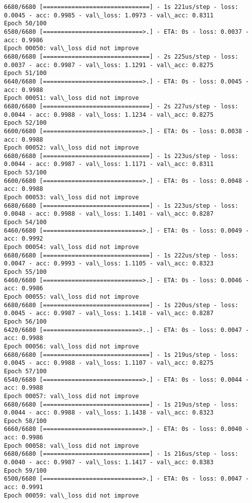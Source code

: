 \documentclass[11pt]{article}
\begin{document}
\begin{Verbatim}[commandchars=\\\{\}]
6680/6680 [==============================] - 1s 221us/step - loss: 0.0045 - acc: 0.9985 - val\_loss: 1.0973 - val\_acc: 0.8311
Epoch 50/100
6580/6680 [============================>.] - ETA: 0s - loss: 0.0037 - acc: 0.9986
Epoch 00050: val\_loss did not improve
6680/6680 [==============================] - 2s 225us/step - loss: 0.0037 - acc: 0.9987 - val\_loss: 1.1291 - val\_acc: 0.8275
Epoch 51/100
6640/6680 [============================>.] - ETA: 0s - loss: 0.0045 - acc: 0.9988
Epoch 00051: val\_loss did not improve
6680/6680 [==============================] - 2s 227us/step - loss: 0.0044 - acc: 0.9988 - val\_loss: 1.1234 - val\_acc: 0.8275
Epoch 52/100
6600/6680 [============================>.] - ETA: 0s - loss: 0.0038 - acc: 0.9988
Epoch 00052: val\_loss did not improve
6680/6680 [==============================] - 1s 223us/step - loss: 0.0044 - acc: 0.9987 - val\_loss: 1.1171 - val\_acc: 0.8311
Epoch 53/100
6600/6680 [============================>.] - ETA: 0s - loss: 0.0048 - acc: 0.9988
Epoch 00053: val\_loss did not improve
6680/6680 [==============================] - 1s 223us/step - loss: 0.0048 - acc: 0.9988 - val\_loss: 1.1401 - val\_acc: 0.8287
Epoch 54/100
6460/6680 [============================>.] - ETA: 0s - loss: 0.0049 - acc: 0.9992
Epoch 00054: val\_loss did not improve
6680/6680 [==============================] - 1s 222us/step - loss: 0.0047 - acc: 0.9993 - val\_loss: 1.1105 - val\_acc: 0.8323
Epoch 55/100
6460/6680 [============================>.] - ETA: 0s - loss: 0.0046 - acc: 0.9986
Epoch 00055: val\_loss did not improve
6680/6680 [==============================] - 1s 220us/step - loss: 0.0045 - acc: 0.9987 - val\_loss: 1.1418 - val\_acc: 0.8287
Epoch 56/100
6420/6680 [===========================>..] - ETA: 0s - loss: 0.0047 - acc: 0.9988
Epoch 00056: val\_loss did not improve
6680/6680 [==============================] - 1s 219us/step - loss: 0.0045 - acc: 0.9988 - val\_loss: 1.1107 - val\_acc: 0.8275
Epoch 57/100
6540/6680 [============================>.] - ETA: 0s - loss: 0.0044 - acc: 0.9988
Epoch 00057: val\_loss did not improve
6680/6680 [==============================] - 1s 219us/step - loss: 0.0044 - acc: 0.9988 - val\_loss: 1.1438 - val\_acc: 0.8323
Epoch 58/100
6660/6680 [============================>.] - ETA: 0s - loss: 0.0040 - acc: 0.9986
Epoch 00058: val\_loss did not improve
6680/6680 [==============================] - 1s 216us/step - loss: 0.0040 - acc: 0.9987 - val\_loss: 1.1417 - val\_acc: 0.8383
Epoch 59/100
6500/6680 [============================>.] - ETA: 0s - loss: 0.0047 - acc: 0.9991
Epoch 00059: val\_loss did not improve

\end{Verbatim}
\end{document}
